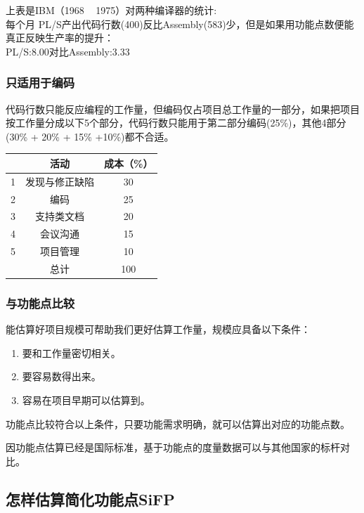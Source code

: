 上表是IBM（1968 ~ 1975）对两种编译器的统计:\\
每个月
PL/S产出代码行数(400)反比Assembly(583)少，但是如果用功能点数便能真正反映生产率的提升：\\
PL/S:8.00对比Assembly:3.33

\hypertarget{ux53eaux9002ux7528ux4e8eux7f16ux7801}{%
\subsubsection{只适用于编码}\label{ux53eaux9002ux7528ux4e8eux7f16ux7801}}

代码行数只能反应编程的工作量，但编码仅占项目总工作量的一部分，如果把项目按工作量分成以下5个部分，代码行数只能用于第二部分编码(25\%)，其他4部分(30\%
+ 20\% + 15\% +10\%)都不合适。


\begin{tabular}{|c|c|c|}
\hline
\:&活动&成本（\%）\\
\hline
1&发现与修正缺陷&30\\
\hline
2&编码&25\\
\hline
3&支持类文档&20\\
\hline
4&会议沟通&15\\
\hline
5&项目管理&10\\
\hline
\:&总计&100\\
\hline
\end{tabular}

\hypertarget{ux4e0eux529fux80fdux70b9ux6bd4ux8f83}{%
\subsubsection{与功能点比较}\label{ux4e0eux529fux80fdux70b9ux6bd4ux8f83}}

能估算好项目规模可帮助我们更好估算工作量，规模应具备以下条件：

\begin{enumerate}
\tightlist
\item
  要和工作量密切相关。
\item
  要容易数得出来。
\item
  容易在项目早期可以估算到。
\end{enumerate}
功能点比较符合以上条件，只要功能需求明确，就可以估算出对应的功能点数。

因功能点估算已经是国际标准，基于功能点的度量数据可以与其他国家的标杆对比。

\hypertarget{ux600eux6837ux4f30sifp}{%
\subsection{怎样估算简化功能点SiFP}\label{ux600eux6837ux4f30sifp}}

